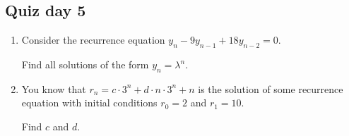 \documentclass[12pt]{article}
\begin{document}


\subsection*{Quiz day 5}

\begin{enumerate} 
    \item Consider the recurrence equation $y_n - 9 y_{n-1} + 18 y_{n-2} = 0$.
    
    Find all solutions of the form $y_n = \lambda^n$.
    \item You know that $r_n = c \cdot 3^n + d \cdot n \cdot 3^n + n$ is the solution of some recurrence equation with initial conditions  $r_0 = 2$ and $r_1 = 10$.
    
    Find $c$ and $d$. 
\end{enumerate}
\end{document}
